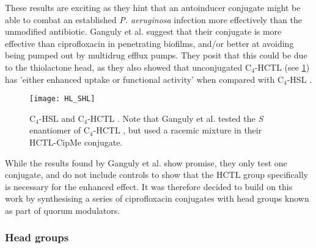 These results are exciting as they hint that an autoinducer conjugate might be able to combat an established \textit{P. aeruginosa} infection more effectively than the unmodified antibiotic. 
Ganguly et al. suggest that their conjugate is more effective than ciprofloxacin in penetrating biofilms, and/or better at avoiding being pumped out by multidrug efflux pumps. They posit that this could be due to the thiolactone head, as they also showed that unconjugated C$_4$-HCTL  (see \ref{fig:HL_SHL}) has 'either enhanced uptake or functional activity' when compared with C$_4$-HSL . 

\begin{figure}[H]
	\begin{center}
		\texttt{[image: HL\_SHL]}
		\caption{
		C$_4$-HSL  and C$_4$-HCTL . Note that Ganguly et al. tested the \textit{S} enantiomer of C$_4$-HCTL , but used a racemic mixture in their HCTL-CipMe conjugate.
		\label{fig:HL_SHL}}
	\end{center}
\end{figure}

While the results found by Ganguly et al. show promise, they only test one conjugate, and do not include controls to show that the HCTL group specifically is necessary for the enhanced effect.
It was therefore decided to build on this work by synthesising a series of ciprofloxacin conjugates with head groups known as part of quorum modulators\cite{Galloway2011,Hodgkinson2012a}.






\subsubsection{Head groups}

